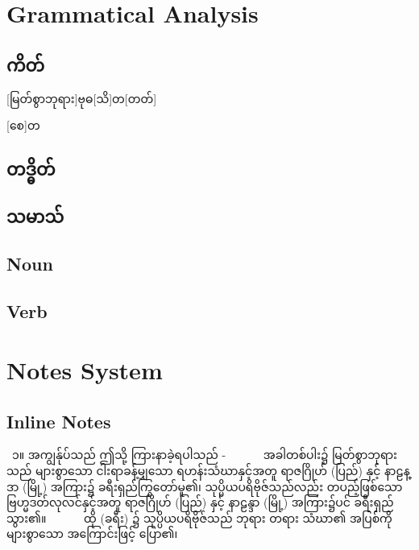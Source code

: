 

\section{Grammatical Analysis}
\subsection{ကိတ်}
\kitabasic{}{}{}

[မြတ်စွာဘုရား]{ဗုဓ}[သိ]{တ}[တတ်]

\kitafull{}{}{}{}


\kitafull*{}{}{}{}

[စေ]{တ}

\subsection{တဒ္ဓိတ်}
\taddhita{}{}{}

\subsection{သမာသ်}
\samasa{}{}{}

\subsection{Noun}

\subsection{Verb}


\section{Notes System}
\subsection{Inline Notes}
 ၁။ အကျွန်ုပ်သည် ဤသို့ ကြားနာခဲ့ရပါသည် -
       အခါတစ်ပါး၌ မြတ်စွာဘုရားသည် များစွာသော ငါးရာခန့်မျှသော ရဟန်းသံဃာနှင့်အတူ ရာဇဂြိုဟ် (ပြည်) နှင့် နာဠန္ဒာ (မြို့) အကြား၌ ခရီးရှည်ကြွတော်မူ၏၊ သုပ္ပိယပရိဗိုဇ်သည်လည်း တပည့်ဖြစ်သော ဗြဟ္မဒတ်လုလင်နှင့်အတူ ရာဇဂြိုဟ် (ပြည်) နှင့် နာဠန္ဒာ (မြို့) အကြား၌ပင် ခရီးရှည်သွား၏။
       ထို (ခရီး) ၌ သုပ္ပိယပရိဗိုဇ်သည် ဘုရား တရား သံဃာ၏ အပြစ်ကို များစွာသော အကြောင်းဖြင့် ပြော၏၊ 

